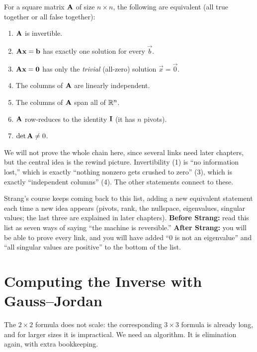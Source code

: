 \begin{theorem}
\label{ch08:imt}
For a square matrix $\mathbf{A}$ of size $n\times n$, the following are equivalent (all
true together or all false together):
\begin{enumerate}
\item $\mathbf{A}$ is invertible.
\item $\mathbf{A}\mathbf{x} = \mathbf{b}$ has exactly one solution for every $\vec{b}$.
\item $\mathbf{A}\mathbf{x} = \mathbf{0}$ has only the \emph{trivial} (all-zero) solution $\vec{x} = \vec{0}$.
\item The columns of $\mathbf{A}$ are linearly independent.
\item The columns of $\mathbf{A}$ span all of $\mathbb{R}^n$.
\item $\mathbf{A}$ row-reduces to the identity $\mathbf{I}$ (it has $n$ pivots).
\item $\det\mathbf{A} \ne 0$.
\end{enumerate}
\end{theorem}

We will not prove the whole chain here, since several links need later chapters, but
the central idea is the rewind picture. Invertibility (1) is ``no information lost,''
which is exactly ``nothing nonzero gets crushed to zero'' (3), which is exactly
``independent columns'' (4). The other statements connect to these.

\begin{strangbox}
Strang's course keeps coming back to this list, adding a new equivalent statement
each time a new idea appears (pivots, rank, the nullspace, eigenvalues, singular
values; the last three are explained in later chapters). \textbf{Before Strang:} read
this list as seven ways of saying ``the machine is reversible.'' \textbf{After Strang:}
you will be able to prove every link, and you will have added ``$0$ is not an eigenvalue''
and ``all singular values are positive'' to the bottom of the list.
\end{strangbox}

\section{Computing the Inverse with Gauss--Jordan}
\label{ch08:gaussjordan}

The $2\times2$ formula does not scale: the corresponding $3\times3$ formula is already
long, and for larger sizes it is impractical. We need an algorithm. It is elimination
again, with extra bookkeeping.

